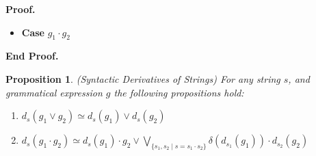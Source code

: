 \documentclass{article}
\newcommand{\setof}[1]{\{{#1}\}}
\newcommand{\comprehend}[2]{\setof{{#1}\;|\;{#2}}}
\newcommand{\deriv}[2]{d_{#1}({#2})}
\newcommand{\emptify}[1]{\delta({#1})}
\newtheorem{prop}{Proposition}
\newenvironment{proof}{\noindent\textbf{Proof.}}
{\noindent\textbf{End Proof.}}
\newenvironment{caseblock}{\begin{itemize}}{\end{itemize}}
\newenvironment{case}[1]{\item \textbf{Case} {#1}\\}{}
\begin{document}
\begin{proof}
\begin{caseblock}
\begin{case}{$g_1\cdot g_2$}
\begin{enumerate}
\begin{itemize}
\begin{enumerate}
\begin{itemize}
                \end{itemize}
            \end{enumerate}
          \end{itemize}
      \end{enumerate}
    \end{case}
  \end{caseblock}
\end{proof}


\begin{prop}{(Syntactic Derivatives of Strings)}
For any string $s$, and grammatical expression $g$ the following propositions hold:
\begin{enumerate}
\item $\deriv{s}{g_1 \vee g_2} \simeq \deriv{s}{g_1} \vee \deriv{s}{g_2}$
\item $\deriv{s}{g_1 \cdot g_2} \simeq \deriv{s}{g_1}\cdot g_2 \vee \bigvee_{\comprehend{s_1, s_2}{s = s_1\cdot s_2}} \emptify{\deriv{s_1}{g_1}}\cdot \deriv{s_2}{g_2}$
\end{enumerate}
\end{prop}
\end{document}
